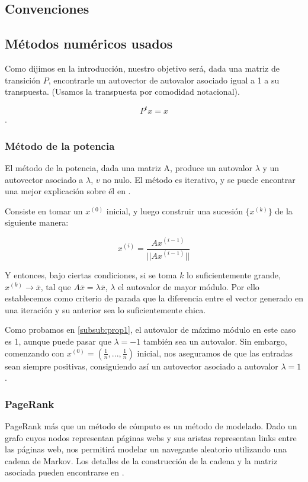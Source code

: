 \subsection{Convenciones}

\subsection{Métodos numéricos usados}

Como dijimos en la introducción, nuestro objetivo será, dada una matriz de transición $P$, encontrarle un autovector de autovalor asociado igual a 1 a su transpuesta. (Usamos la transpuesta por comodidad notacional).

\[P^t x = x\].


\subsubsection{Método de la potencia}
El método de la potencia, dada una matriz A, produce un autovalor $\lambda$ y un autovector asociado a $\lambda$, $v$ no nulo. El método es iterativo, y se puede encontrar una mejor explicación sobre él en \cite[Cap. 5.8.1]{dahlquist}. 

Consiste en tomar un $x^{(0)}$ inicial, y luego construir una sucesión $\{x^{(k)}\}$ de la siguiente manera:

\[x^{(i)} = \frac{A x^{(i-1)}}{||A x^{(i-1)}||}\]

Y entonces, bajo ciertas condiciones, si se toma $k$ lo suficientemente grande, $x^{(k)} \to \overline{x}$, tal que $A\overline{x} = \lambda \overline{x}$, $\lambda$ el autovalor de mayor módulo. Por ello establecemos como criterio de parada que la diferencia entre el vector generado en una iteración y su anterior sea lo suficientemente chica.

Como probamos en \ref{subsub:prop1}, el autovalor de máximo módulo en este caso es 1, aunque puede pasar que $\lambda = -1$ también sea un autovalor. Sin embargo, comenzando con $x^{(0)} = (\frac1n,..., \frac1n)$ inicial, nos aseguramos de que las entradas sean siempre positivas, consiguiendo así un autovector asociado a autovalor $\lambda = 1$.

\subsubsection{PageRank}
PageRank más que un m\'etodo de cómputo es un m\'etodo de modelado. Dado un grafo cuyos nodos representan páginas webs y sus aristas representan links entre las páginas web, nos permitirá modelar un navegante aleatorio utilizando una cadena de Markov. 
Los detalles de la construcción de la cadena y la matriz asociada pueden encontrarse en \cite{Brin1998}.

